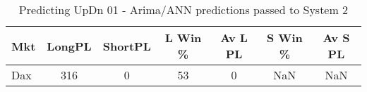\begin{table}[ht]
\centering
\caption[Predicting UpDn 01 - Arima/ANN predictions passed to System 2.]{Predicting UpDn 01 - Arima/ANN predictions passed to System 2} 
\label{tab:chp_ts:pUD_01_arima_ann_sys}
\begin{tabular}{lcccccc}
  \toprule Mkt & LongPL & ShortPL & L Win \% & Av L PL & S Win \% & Av S PL \\ 
  \midrule Dax & 316 & 0 & 53 & 0 & NaN & NaN \\ 
   \bottomrule \end{tabular}
\end{table}
